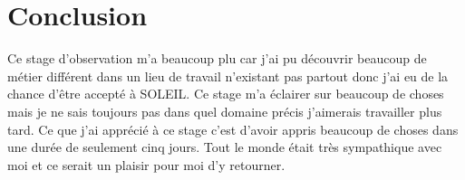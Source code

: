 





			
	\section{Conclusion}
		
        Ce stage d'observation m'a beaucoup plu car j'ai pu découvrir beaucoup de métier différent dans un lieu de travail n'existant pas partout donc j'ai eu de la chance d'être accepté à SOLEIL. Ce stage m'a éclairer sur beaucoup de choses mais je ne sais toujours pas dans quel domaine précis j'aimerais travailler plus tard. Ce que j'ai apprécié à ce stage c'est d'avoir appris beaucoup de choses dans une durée de seulement cinq jours.
        Tout le monde était très sympathique avec moi et ce serait un plaisir pour moi d'y retourner.
